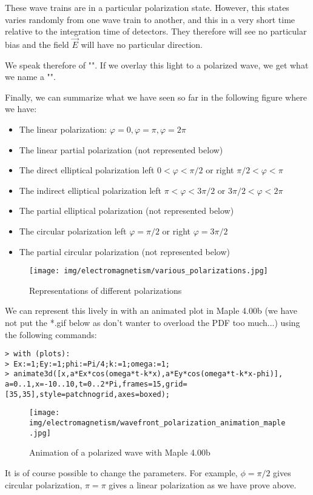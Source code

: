 	These wave trains are in a particular polarization state. However, this states varies randomly from one wave train to another, and this in a very short time relative to the integration time of detectors. They therefore will see no particular bias and the field $\vec{E}$ will have no particular direction.

	We speak therefore of "". If we overlay this light to a polarized wave, we get what we name a "".
	
	Finally, we can summarize what we have seen so far in the following figure where we have:
	\begin{itemize}
		\item The linear polarization: $\varphi=0,\varphi=\pi,\varphi=2\pi$

		\item The linear partial polarization (not represented below)

		\item The direct elliptical polarization left $0<\varphi<\pi/2$ or right $\pi/2<\varphi<\pi$

		\item The indirect elliptical polarization left $\pi<\varphi<3\pi/2$ or $3\pi/2<\varphi <2\pi$

		\item The partial elliptical polarization (not represented below)

		\item The circular polarization left $\varphi=\pi/2$ or right $\varphi=3\pi/2$

		\item The partial circular polarization (not represented below)
	\end{itemize}
	\begin{figure}[H]
		\centering
		\texttt{[image: img/electromagnetism/various\_polarizations.jpg]}
		\caption{Representations of different polarizations}
	\end{figure}
	
	We can represent this lively in with an animated plot in Maple 4.00b (we have not put the *.gif below as don't wanter to overload the PDF too much...) using the following commands:
	
	\texttt{> with (plots):\\
	> Ex:=1;Ey:=1;phi:=Pi/4;k:=1;omega:=1;\\
	> animate3d([x,a*Ex*cos(omega*t-k*x),a*Ey*cos(omega*t-k*x-phi)],\\
	a=0..1,x=-10..10,t=0..2*Pi,frames=15,grid=[35,35],style=patchnogrid,axes=boxed);}
	\begin{figure}[H]
		\centering
		\texttt{[image: img/electromagnetism/wavefront\_polarization\_animation\_maple.jpg]}
		\caption{Animation of a polarized wave with Maple 4.00b}
	\end{figure}
	It is of course possible to change the parameters. For example, $\phi=\pi/2$ gives circular polarization, $\pi=\pi$ gives a linear polarization as we have prove above.

